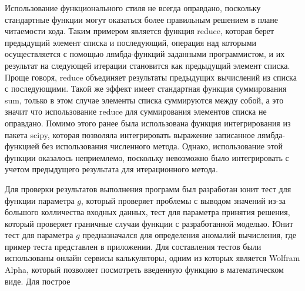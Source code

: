 Использование функционального стиля не всегда оправдано, поскольку стандартные функции могут оказаться
более правильным решением в плане читаемости кода.
Таким примером является функция reduce, которая берет предыдущий элемент списка и последующий, операция
над которыми осуществляется с помощью лямбда-функций заданными программистом, и их результат на следующей
итерации становится как предыдущий элемент списка.
Проще говоря, reduce объединяет результаты предыдущих вычислений из списка с последующими.
Такой же эффект имеет стандартная функция суммирования sum, только в этом случае элементы списка суммируются
между собой, а это значит что использование reduce для суммирования элементов списка не оправдано.
Помимо этого ранее была использована функция интегрирования из пакета scipy, которая позволяла интегрировать
выражение записанное лямбда-функцией без использования численного метода.
Однако, использование этой функции оказалось неприемлемо, поскольку невозможно было интегрировать с учетом
предыдущего результата для итерационного метода.

Для проверки результатов выполнения программ был разработан юнит тест для функции параметра $g$, который
проверяет проблемы с выводом значений из-за большого колличества входных данных, тест для параметра принятия
решения, который проверяет граничные случаи функции с разработанной моделью.
Юнит тест для параметра $g$ предназначался для определения аномалий вычисления, где пример теста представлен в приложении.
Для составления тестов были использованы онлайн сервисы калькуляторы, одним из которых является Wolfram Alpha,
который позволяет посмотреть введенную функцию в математическом виде.
Для построе